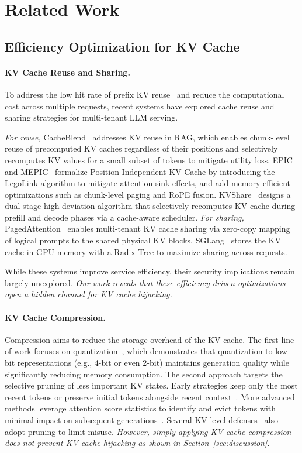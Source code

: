 \section{Related Work}

\subsection{Efficiency Optimization for KV Cache}
\paragraph{KV Cache Reuse and Sharing.}
To address the low hit rate of prefix KV reuse~\cite{pope2023efficiently} and reduce the computational cost across multiple requests, recent systems have explored cache reuse and sharing strategies for multi-tenant LLM serving. 

\emph{For reuse,} CacheBlend~\cite{yao2025cacheblend} addresses KV reuse in RAG, which enables chunk-level reuse of precomputed KV caches regardless of their positions and selectively recomputes KV values for a small subset of tokens to mitigate utility loss. 
% 
EPIC~\cite{hu2025epic} and MEPIC~\cite{wang2025mepic} formalize Position-Independent KV Cache by introducing the LegoLink algorithm to mitigate attention sink effects, and add memory-efficient optimizations such as chunk-level paging and RoPE fusion. 
% 
KVShare~\cite{yang2025kvshare} designs a dual-stage high deviation algorithm that selectively recomputes KV cache during prefill and decode phases via a cache-aware scheduler. 
\emph{For sharing,} PagedAttention~\cite{kwon2023efficient} enables multi-tenant KV cache sharing via zero-copy mapping of logical prompts to the shared physical KV blocks. SGLang~\cite{zheng2024sglang} stores the KV cache in GPU memory with a Radix Tree to maximize sharing across requests.

While these systems improve service efficiency, their security implications remain largely unexplored. \emph{Our work reveals that these efficiency-driven optimizations open a hidden channel for KV cache hijacking.}

\paragraph{KV Cache Compression.}
Compression aims to reduce the storage overhead of the KV cache. The first line of work focuses on quantization~\cite{hooper2024kvquant,liu2024kivi}, which demonstrates that quantization to low-bit representations (e.g., 4-bit or even 2-bit) maintains generation quality while significantly reducing memory consumption. 
% 
The second approach targets the selective pruning of less important KV states. Early strategies keep only the most recent tokens or preserve initial tokens alongside recent context~\cite{xiao2023efficient}. More advanced methods leverage attention score statistics to identify and evict tokens with minimal impact on subsequent generations~\cite{zhang2023h2o,liu2023scissorhands}. Several KV-level defenses~\cite{jiang2024robustkv, wang2025cacheprune} also adopt pruning to limit misuse. \textit{However, simply applying KV cache compression does not prevent KV cache hijacking as shown in Section~\ref{sec:discussion}.}

